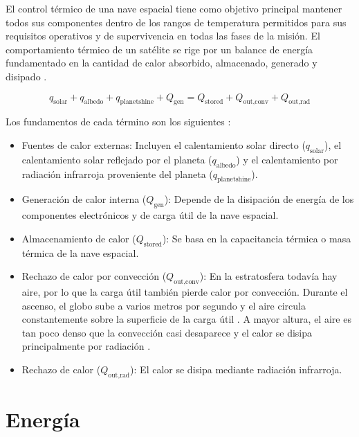 \documentclass[12pt,a4paper]{article}
\begin{document}
El control térmico de una nave espacial tiene como objetivo principal mantener todos sus componentes dentro de los rangos de temperatura permitidos para sus requisitos operativos y de supervivencia en todas las fases de la misión. El comportamiento térmico de un satélite se rige por un balance de energía fundamentado en la cantidad de calor absorbido, almacenado, generado y disipado \cite{ref39}.

\begin{equation}
  q_{\text{solar}} + q_{\text{albedo}} + q_{\text{planetshine}} + Q_{\text{gen}} = Q_{\text{stored}} + Q_{\text{out,conv}} + Q_{\text{out,rad}}
  \label{eq:balance-termico}
\end{equation}

Los fundamentos de cada término son los siguientes \cite{ref39}:

\begin{itemize}
\item
  Fuentes de calor externas: Incluyen el calentamiento solar directo ($q_{\text{solar}}$), el calentamiento solar reflejado por el planeta ($q_{\text{albedo}}$) y el calentamiento por radiación infrarroja proveniente del planeta ($q_{\text{planetshine}}$).
\item
  Generación de calor interna ($Q_{\text{gen}}$): Depende de la disipación de energía de los componentes electrónicos y de carga útil de la nave espacial.
\item
  Almacenamiento de calor ($Q_{\text{stored}}$): Se basa en la capacitancia térmica o masa térmica de la nave espacial.
\item
  Rechazo de calor por convección ($Q_{\text{out,conv}}$): En la estratosfera todavía hay aire, por lo que la carga útil también pierde calor por convección. Durante el ascenso, el globo sube a varios metros por segundo y el aire circula constantemente sobre la superficie de la carga útil \cite{ref113}. A mayor altura, el aire es tan poco denso que la convección casi desaparece y el calor se disipa principalmente por radiación \cite{ref114}.
\item
  Rechazo de calor ($Q_{\text{out,rad}}$): El calor se disipa mediante radiación infrarroja. 
\end{itemize}

\newpage


\section{Energía}\label{energia-fundamentos}
\end{document}
